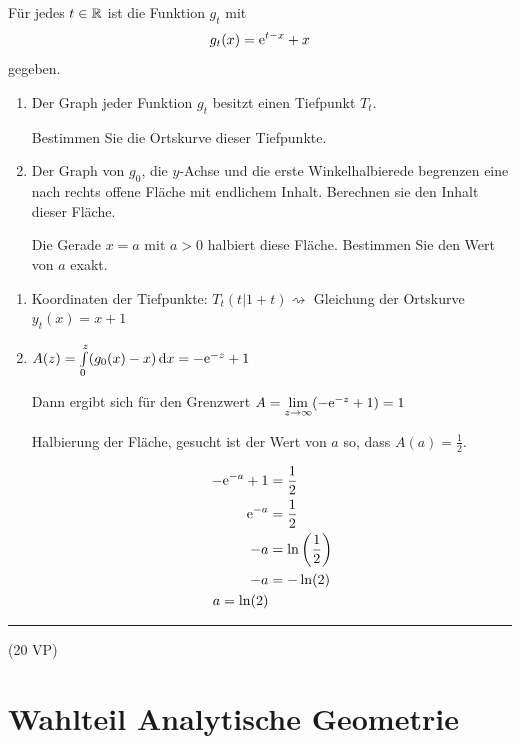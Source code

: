 \aufgabe{}
Für jedes $t\in \mathbb{R}$ ist die Funktion $g_t$ mit
\begin{equation*}
	g_t(x)=\mathrm{e}^{t-x}+x
\end{equation*}
gegeben.
\begin{enumerate}
	\item Der Graph jeder Funktion $g_t$ besitzt einen Tiefpunkt $T_t$.

	Bestimmen Sie die Ortskurve dieser Tiefpunkte. 
	\item Der Graph von $g_0$, die $y$-Achse und die erste Winkelhalbierede begrenzen eine nach rechts offene Fläche mit endlichem Inhalt. Berechnen sie den Inhalt dieser Fläche.

	Die Gerade $x=a$ mit $a>0$ halbiert diese Fläche. Bestimmen Sie den Wert von $a$ exakt. 
\end{enumerate}
\begin{lsg}{}
	\begin{enumerate}
		\item Koordinaten der Tiefpunkte: $T_t(t|1+t) \rightsquigarrow$ Gleichung der Ortskurve $y_t(x)=x+1$
		\item $A(z)=\int\limits_0^z(g_0(x)-x)\,\mathrm{d} x=-\mathrm{e}^{-z}+1$

		Dann ergibt sich für den Grenzwert $A=\lim\limits_{z\rightarrow \infty} (-\mathrm{e}^{-z}+1)=1$

		Halbierung der Fläche, gesucht ist der Wert von $a$ so, dass $A(a)=\frac 1 2$.

		\begin{align*}
			-\mathrm{e}^{-a}+1 &= \frac 1 2\\
			\mathrm{e}^{-a} &= \frac 1 2\\
			-a &= \ln\left(\frac 1 2\right)\\
			-a &= -\ln(2)\\
			a = \ln(2)
		\end{align*}
	\end{enumerate}
\end{lsg}






\vfill

\hfill\rule{1.5cm}{0.4mm}

\hfill (20 VP)\hspace{0.22cm}





\section{Wahlteil Analytische Geometrie}

